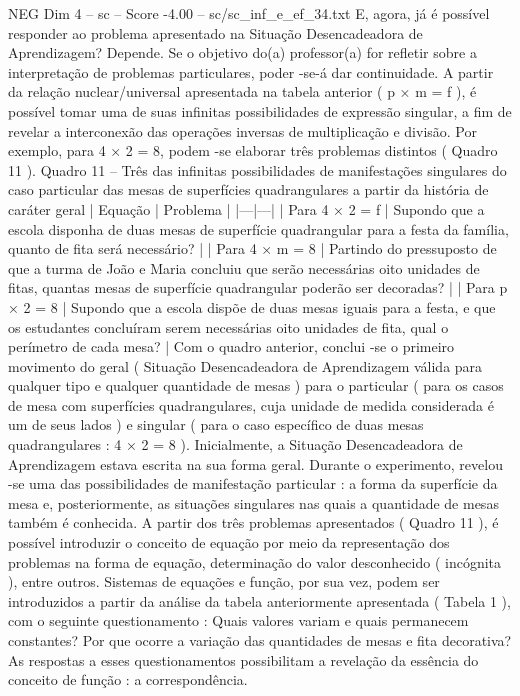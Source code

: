 \begin{textsample}{NEG Dim 4 – sc – Score -4.00 – sc/sc\_inf\_e\_ef\_34.txt}
E, agora, já é possível responder ao problema apresentado na Situação Desencadeadora de Aprendizagem?
Depende.
Se o objetivo do(a) professor(a) for refletir sobre a interpretação de problemas particulares, poder -se-á dar continuidade.
A partir da relação nuclear/universal apresentada na tabela anterior ( p × m = f ), é possível tomar uma de suas infinitas possibilidades de expressão singular, a fim de revelar a interconexão das operações inversas de multiplicação e divisão.
Por exemplo, para 4 × 2 = 8, podem -se elaborar três problemas distintos ( Quadro 11 ).
Quadro 11 – Três das infinitas possibilidades de manifestações singulares do caso particular das mesas de superfícies quadrangulares a partir da história de caráter geral | Equação | Problema | |---|---| | Para 4 × 2 = f | Supondo que a escola disponha de duas mesas de superfície quadrangular para a festa da família, quanto de fita será necessário? | | Para 4 × m = 8 | Partindo do pressuposto de que a turma de João e Maria concluiu que serão necessárias oito unidades de fitas, quantas mesas de superfície quadrangular poderão ser decoradas? | | Para p × 2 = 8 | Supondo que a escola dispõe de duas mesas iguais para a festa, e que os estudantes concluíram serem necessárias oito unidades de fita, qual o perímetro de cada mesa? | Com o quadro anterior, conclui -se o primeiro movimento do geral ( Situação Desencadeadora de Aprendizagem válida para qualquer tipo e qualquer quantidade de mesas ) para o particular ( para os casos de mesa com superfícies quadrangulares, cuja unidade de medida considerada é um de seus lados ) e singular ( para o caso específico de duas mesas quadrangulares : 4 × 2 = 8 ).
Inicialmente, a Situação Desencadeadora de Aprendizagem estava escrita na sua forma geral.
Durante o experimento, revelou -se uma das possibilidades de manifestação particular : a forma da superfície da mesa e, posteriormente, as situações singulares nas quais a quantidade de mesas também é conhecida.
A partir dos três problemas apresentados ( Quadro 11 ), é possível introduzir o conceito de equação por meio da representação dos problemas na forma de equação, determinação do valor desconhecido ( incógnita ), entre outros.
Sistemas de equações e função, por sua vez, podem ser introduzidos a partir da análise da tabela anteriormente apresentada ( Tabela 1 ), com o seguinte questionamento : Quais valores variam e quais permanecem constantes?
Por que ocorre a variação das quantidades de mesas e fita decorativa?
As respostas a esses questionamentos possibilitam a revelação da essência do conceito de função : a correspondência.

\end{textsample}
